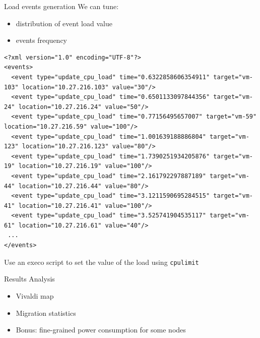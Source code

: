 \documentclass{beamer}
\begin{document}
\begin{frame}[fragile]{Load events generation}
We can tune:
\begin{itemize}
    \item distribution of event load value
    \item events frequency
\end{itemize}
\tiny
\begin{verbatim}
<?xml version="1.0" encoding="UTF-8"?>
<events>
  <event type="update_cpu_load" time="0.6322858606354911" target="vm-103" location="10.27.216.103" value="30"/>
  <event type="update_cpu_load" time="0.6501133097844356" target="vm-24" location="10.27.216.24" value="50"/>
  <event type="update_cpu_load" time="0.77156495657007" target="vm-59" location="10.27.216.59" value="100"/>
  <event type="update_cpu_load" time="1.001639188886804" target="vm-123" location="10.27.216.123" value="80"/>
  <event type="update_cpu_load" time="1.7390251934205876" target="vm-19" location="10.27.216.19" value="100"/>
  <event type="update_cpu_load" time="2.161792297887189" target="vm-44" location="10.27.216.44" value="80"/>
  <event type="update_cpu_load" time="3.1211590695284515" target="vm-41" location="10.27.216.41" value="100"/>
  <event type="update_cpu_load" time="3.525741904535117" target="vm-61" location="10.27.216.61" value="40"/>
 ...
</events>
\end{verbatim}
\begin{block}{}
\normalsize
Use an execo script to set the value of the load using \verb=cpulimit=
\end{block}
\end{frame}


\begin{frame}{Results Analysis}
\begin{itemize}
    \item Vivaldi map
    \item Migration statistics
    \item Bonus: fine-grained power consumption for some nodes
\end{itemize}
\end{frame}
\end{document}
